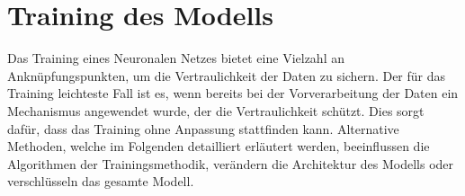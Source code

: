 \section{Training des Modells}\label{sec:training_modells}

Das Training eines Neuronalen Netzes bietet eine Vielzahl an Anknüpfungspunkten, um die Vertraulichkeit der Daten zu sichern.
Der für das Training leichteste Fall ist es, wenn bereits bei der Vorverarbeitung der Daten ein Mechanismus angewendet wurde, der die Vertraulichkeit schützt.
Dies sorgt dafür, dass das Training ohne Anpassung stattfinden kann.
Alternative Methoden, welche im Folgenden detailliert erläutert werden, beeinflussen die Algorithmen der Trainingsmethodik, verändern die Architektur des Modells oder verschlüsseln das gesamte Modell.







